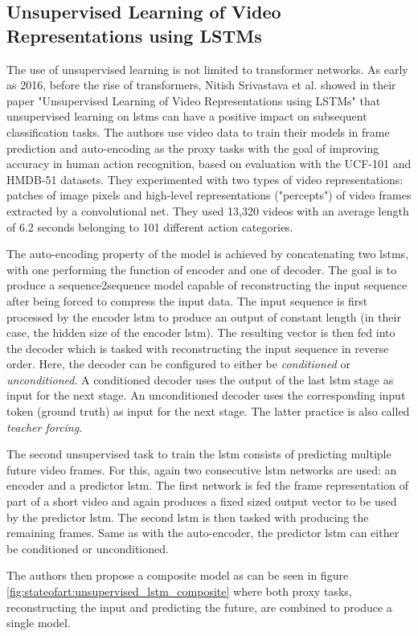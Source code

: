 \subsection{Unsupervised Learning of Video Representations using LSTMs} \label{sec:stateofart:unsupervised_video_lstm}

The use of unsupervised learning is not limited to transformer networks. As early as 2016, before the rise of transformers, Nitish Srivastava et al. showed in their paper "Unsupervised Learning of Video Representations using LSTMs" \cite{unsupervised_learning_lstms} that unsupervised learning on \glspl{lstm} can have a positive impact on subsequent classification tasks. The authors use video data to train their models in frame prediction and auto-encoding as the proxy tasks with the goal of improving accuracy in human action recognition, based on evaluation with the UCF-101 and
HMDB-51 datasets. They experimented with two types of video representations: patches of image pixels and high-level representations ("percepts") of video frames extracted by a convolutional net. They used 13,320 videos with an average length of 6.2 seconds belonging to 101 different action categories. \par
The auto-encoding property of the model is achieved by concatenating two \glspl{lstm}, with one performing the function of encoder and one of decoder. The goal is to produce a sequence2sequence model capable of reconstructing the input sequence after being forced to compress the input data. The input sequence is first processed by the encoder \gls{lstm} to produce an output of constant length (in their case, the hidden size of the encoder \gls{lstm}). The resulting vector is then fed into the decoder which is tasked with reconstructing the input sequence in reverse order. Here, the decoder can be configured to either be \textit{conditioned} or \textit{unconditioned}. A conditioned decoder uses the output of the last \gls{lstm} stage as input for the next stage. An unconditioned decoder uses the corresponding input token (ground truth) as input for the next stage. The latter practice is also called \textit{teacher forcing}. \par
The second unsupervised task to train the \gls{lstm} consists of predicting multiple future video frames. For this, again two consecutive \gls{lstm} networks are used: an encoder and a predictor \gls{lstm}. The first network is fed the frame representation of part of a short video and again produces a fixed sized output vector to be used by the predictor \gls{lstm}. The second \gls{lstm} is then tasked with producing the remaining frames. Same as with the auto-encoder, the predictor \gls{lstm} can either be conditioned or unconditioned. \par
The authors then propose a composite model as can be seen in figure \ref{fig:stateofart:unsupervised_lstm_composite} where both proxy tasks, reconstructing the input and predicting the future, are combined to produce a single model.

